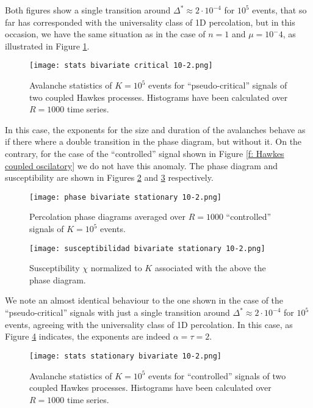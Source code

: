 Both figures show a single transition around $\Delta^*\approx 2\cdot 10^{-4}$ for $10^5$ events, that so far has corresponded with the universality class of 1D percolation, but in this occasion, we have the same 
situation as in the case of $n=1$ and $\mu=10^-4$, as illustrated in Figure \ref{f: stats pseudocritical}.

\begin{figure}[H]
    \centering
    \texttt{[image: stats bivariate critical 10-2.png]}
    \caption{Avalanche statistics of $K=10^5$ events for ``pseudo-critical'' signals of two coupled Hawkes processes. Histograms have been calculated over $R=1000$ time series.}
    \label{f: stats pseudocritical}
\end{figure}

In this case, the exponents for the size and duration of the avalanches behave as if there where a double transition in the phase diagram, but without it. On the contrary, for the case of 
the ``controlled'' signal shown in Figure \ref{f: Hawkes coupled oscilatory} we do not have this anomaly. The phase diagram and susceptibility are shown in Figures 
\ref{f:phase_diagram_coupled oscilatory} and \ref{f:susceptibilidad_coupled oscilatory} respectively.

\begin{figure}[H]
    \centering
    \texttt{[image: phase bivariate stationary 10-2.png]}
    \caption{Percolation phase diagrams averaged over $R=1000$ ``controlled'' signals of $K=10^5$ events.}
    \label{f:phase_diagram_coupled oscilatory}
\end{figure}

\begin{figure}[H]
    \centering
    \texttt{[image: susceptibilidad bivariate stationary 10-2.png]}
    \caption{Susceptibility $\chi$ normalized to $K$ associated with the above the phase diagram.}
    \label{f:susceptibilidad_coupled oscilatory}
\end{figure}

We note an almost identical behaviour to the one shown in the case of the ``pseudo-critical'' signals with just a single transition around $\Delta^*\approx 2\cdot 10^{-4}$ for $10^5$ events, 
agreeing with the universality class of 1D percolation. In this case, as Figure \ref{f: stats oscilatory} 
indicates, the exponents are indeed $\alpha=\tau=2$.

\begin{figure}[H]
    \centering
    \texttt{[image: stats stationary bivariate 10-2.png]}
    \caption{Avalanche statistics of $K=10^5$ events for ``controlled'' signals of two coupled Hawkes processes. Histograms have been calculated over $R=1000$ time series.}
    \label{f: stats oscilatory}
\end{figure}

